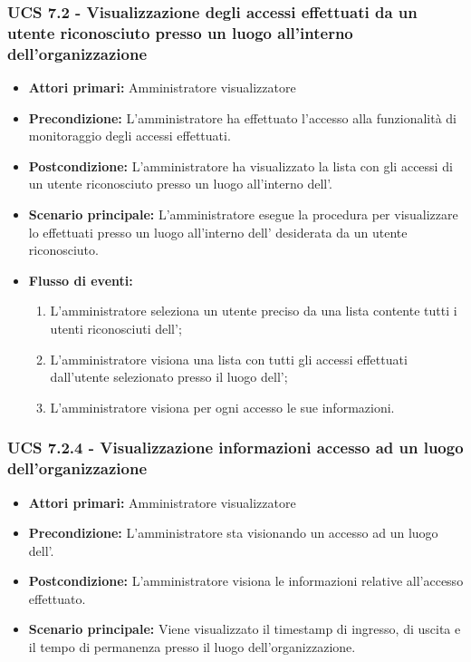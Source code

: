 \subsubsection{UCS 7.2 - Visualizzazione degli accessi effettuati da un utente riconosciuto presso un luogo all'interno dell'organizzazione}
\begin{itemize}
	\item \textbf{Attori primari:} Amministratore visualizzatore
	\item \textbf{Precondizione:} L'amministratore ha effettuato l'accesso alla funzionalità di monitoraggio degli accessi effettuati.
	\item \textbf{Postcondizione:} L'amministratore ha visualizzato la lista con gli accessi di un utente riconosciuto presso un luogo all'interno dell'.
	\item \textbf{Scenario principale:} L'amministratore esegue la procedura per visualizzare lo  effettuati presso un luogo all'interno dell' desiderata da un utente riconosciuto.
	\item \textbf{Flusso di eventi:}
	\begin{enumerate}
		\item L'amministratore seleziona un utente preciso da una lista contente tutti i utenti riconosciuti dell';
		\item L'amministratore visiona una lista con tutti gli accessi effettuati dall'utente selezionato presso il luogo dell';
		\item L'amministratore visiona per ogni accesso le sue informazioni.
	\end{enumerate}
\end{itemize}

\subsubsection{UCS 7.2.4 - Visualizzazione informazioni accesso ad un luogo dell'organizzazione}
\begin{itemize}
	\item \textbf{Attori primari:} Amministratore visualizzatore
	\item \textbf{Precondizione:} L'amministratore sta visionando un accesso ad un luogo dell'.
	\item \textbf{Postcondizione:} L'amministratore visiona le informazioni relative all'accesso effettuato.
	\item \textbf{Scenario principale:} Viene visualizzato il timestamp di ingresso, di uscita e il tempo di permanenza presso il luogo dell'organizzazione.
\end{itemize}

